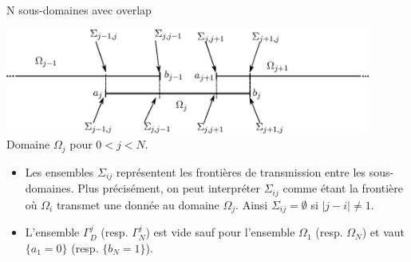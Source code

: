 \documentclass[
mode=present,    %
paper=a4paper,   %
orient=landscape,
display=slides,   %
size=10pt,
style=romain   %
]{powerdot}
\begin{document}
\begin{slide}[toc=]{N sous-domaines avec overlap}

\begin{center}
 \includegraphics[width=0.9\textwidth]{ndom.eps}\\[1em]
 Domaine $\Omega_{j}$ pour $0<j<N$.
\end{center}

\begin{itemize}
\item Les ensembles $\Sigma_{ij}$ représentent les frontières de transmission
  entre les sous-domaines. Plus précisément, on peut interpréter
  $\Sigma_{ij}$ comme étant la frontière où $\Omega_{i}$ transmet une donnée
  au domaine $\Omega_{j}$. Ainsi $\Sigma_{ij}= \emptyset$ si $|j-i| \neq1$. 
\item L'ensemble $\Gamma_{D}^{j}$ (resp. $\Gamma_{N}^{j}$) est vide sauf
  pour l'ensemble $\Omega_{1}$ (resp. $\Omega_{N}$) et vaut $\{a_{1} = 0\}$
  (resp. $\{b_{N} = 1\}$). 
\end{itemize}

\end{slide}
\end{document}
